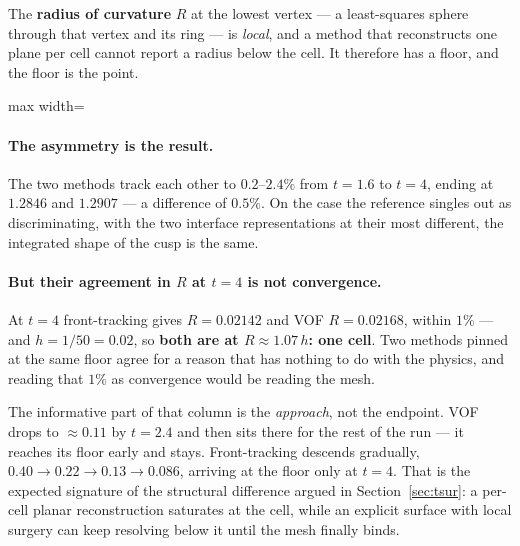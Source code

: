 The \textbf{radius of curvature} $R$ at the lowest vertex --- a least-squares
sphere through that vertex and its ring --- is \emph{local}, and a method that
reconstructs one plane per cell cannot report a radius below the cell. It
therefore has a floor, and the floor is the point.

\begin{table}[htbp]
\centering
\caption{The two measures over time, both methods, reference resolution. The
asymmetry agrees throughout; $R/R_{\mathrm{eq}}$ does not, until both reach the
mesh floor.}
\label{tab:cusppair}
\small
\begin{adjustbox}{max width=\linewidth}
\end{adjustbox}
\end{table}

\paragraph{The asymmetry is the result.} The two methods track each other to
$0.2$--$2.4\%$ from $t=1.6$ to $t=4$, ending at $1.2846$ and $1.2907$ --- a
difference of $0.5\%$. On the case the reference singles out as discriminating,
with the two interface representations at their most different, the integrated
shape of the cusp is the same.

\paragraph{But their agreement in $R$ at $t=4$ is not convergence.} At $t=4$
front-tracking gives $R = 0.02142$ and VOF $R = 0.02168$, within $1\%$ --- and
$h = 1/50 = 0.02$, so \textbf{both are at $R \approx 1.07\,h$: one cell}. Two
methods pinned at the same floor agree for a reason that has nothing to do with
the physics, and reading that $1\%$ as convergence would be reading the mesh.

The informative part of that column is the \emph{approach}, not the endpoint.
VOF drops to $\approx 0.11$ by $t=2.4$ and then sits there for the rest of the
run --- it reaches its floor early and stays. Front-tracking descends
gradually, $0.40 \to 0.22 \to 0.13 \to 0.086$, arriving at the floor only at
$t=4$. That is the expected signature of the structural difference argued in
Section~\ref{sec:tsur}: a per-cell planar reconstruction saturates at the cell,
while an explicit surface with local surgery can keep resolving below it until
the mesh finally binds.

